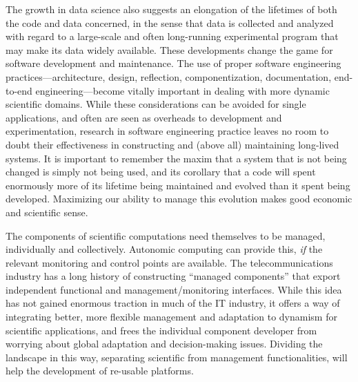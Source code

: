 The growth in data science also suggests an elongation of the
lifetimes of both the code and data concerned, in the sense that data
is collected and analyzed with regard to a large-scale and often
long-running experimental program that may make its data widely
available.  These developments change the game
for software development and maintenance. The use of proper software
engineering practices---architecture, design, reflection,
componentization, documentation, end-to-end engineering---become
vitally important in dealing with more dynamic scientific
domains. While these considerations can be avoided for single
applications, and often are seen as overheads to development and
experimentation, research in software engineering practice leaves no
room to doubt their effectiveness in constructing and (above all)
maintaining long-lived systems. It is important to remember the maxim
that a system that is not being changed is simply not being used, and
its corollary that a code will spent enormously more of its lifetime
being maintained and evolved than it spent being
developed.   
Maximizing our ability to manage this evolution makes good economic
and scientific sense.  

The components of scientific computations need themselves to be
managed, individually and collectively. Autonomic computing can
provide this, \emph{if} the relevant monitoring and control points are
available. The telecommunications industry has a long history of
constructing ``managed components'' that export independent functional
and management/monitoring interfaces. While this idea has not gained
enormous traction   in
much of the IT industry, it offers a way of integrating better, more
flexible management and adaptation to dynamism for scientific
applications, and frees the individual component developer from
worrying about global adaptation and decision-making issues. Dividing
the landscape in this way, separating scientific from management
functionalities, will help the development of re-usable
platforms.  

